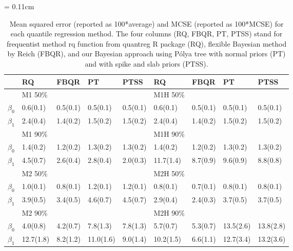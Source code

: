 \documentclass[12pt]{article}
\newcommand{\polya}{P\'{o}lya}
\begin{document}
\begin{center}
  \begin{table}[h]
    \centering
    \caption[]{ Mean squared error (reported as 100*average) and MCSE
      (reported as 100*MCSE) for each
      quantile regression method.   The four
      columns (RQ, FBQR,
      PT, PTSS) stand for frequentist method rq function from
      quantreg R package (RQ), flexible Bayesian method by Reich (FBQR), and
      our Bayesian approach using \polya{} tree with normal priors (PT) and with
      spike and slab priors (PTSS).}
    \vspace{4mm}
    \tabcolsep = 0.11cm
    \begin{tabular}[tb]{cllllllll}
  \hline
          & RQ        & FBQR      & PT        & PTSS      & RQ        & FBQR      & PT        & PTSS      \\
      \hline
          & M1 50\%   &           &           &           & M1H 50\%  &           &           &           \\
$\beta_0$ & 0.6(0.1)  & 0.5(0.1)  & 0.5(0.1)  & 0.5(0.1)  & 0.6(0.1)  & 0.5(0.1)  & 0.5(0.1)  & 0.5(0.1)  \\
$\beta_1$ & 2.4(0.4)  & 1.4(0.2)  & 1.5(0.2)  & 1.5(0.2)  & 2.4(0.4)  & 1.4(0.2)  & 1.5(0.2)  & 1.5(0.2)  \\
          & M1 90\%   &           &           &           & M1H 90\%  &           &           &           \\
$\beta_0$ & 1.4(0.2)  & 1.2(0.2)  & 1.3(0.2)  & 1.3(0.2)  & 1.4(0.2)  & 1.2(0.2)  & 1.3(0.2)  & 1.3(0.2)  \\
$\beta_1$ & 4.5(0.7)  & 2.6(0.4)  & 2.8(0.4)  & 2.0(0.3)    & 11.7(1.4) & 8.7(0.9)  & 9.6(0.9)  & 8.8(0.8)  \\
          & M2 50\%   &           &           &           & M2H 50\%  &           &           &           \\
$\beta_0$ & 1.0(0.1)  & 0.8(0.1)  & 1.2(0.1)  & 1.2(0.1)  & 0.8(0.1)  & 0.7(0.1)  & 0.8(0.1)  & 0.8(0.1)  \\
$\beta_1$ & 3.9(0.5)  & 3.4(0.5)  & 4.6(0.7)  & 4.5(0.7)  & 2.9(0.4)  & 2.4(0.3)  & 3.7(0.5)  & 3.7(0.5)  \\
          & M2 90\%   &           &           &           & M2H 90\%  &           &           &           \\
$\beta_0$ & 4.0(0.8)  & 4.2(0.7)  & 7.8(1.3)  & 7.8(1.3)  & 5.7(0.7)  & 5.3(0.7)  & 13.5(2.6) & 13.8(2.8) \\
$\beta_1$ & 12.7(1.8) & 8.2(1.2)  & 11.0(1.6) & 9.0(1.4)  & 10.2(1.5) & 6.6(1.1)  & 12.7(3.4) & 13.2(3.6) \\

\end{tabular}
\end{table}
\end{center}
\end{document}

